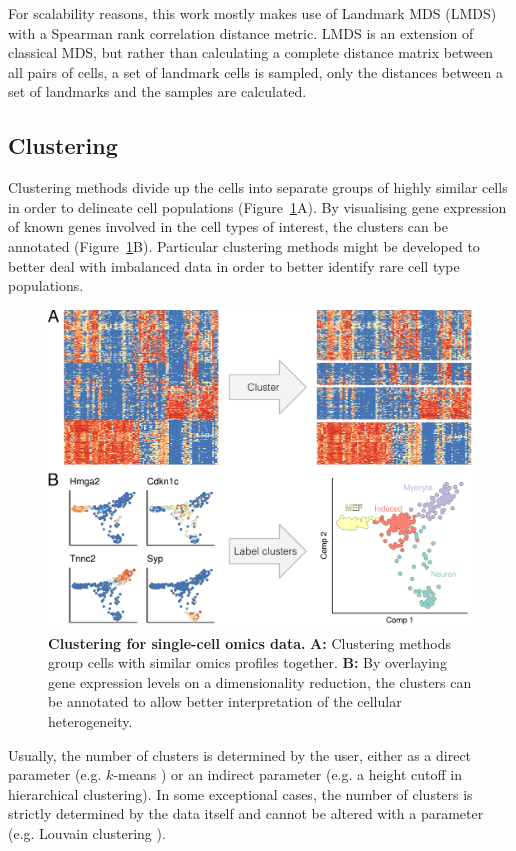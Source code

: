For scalability reasons, this work mostly makes use of Landmark MDS \cite{silva_globallocalmethods_2002,lee_landmarkmdsensemble_2009} (LMDS) with a Spearman rank correlation distance metric. LMDS is an extension of classical MDS, but rather than calculating a complete distance matrix between all pairs of cells, a set of landmark cells is sampled, only the distances between a set of landmarks and the samples are calculated. 

\subsection{Clustering}
Clustering methods divide up the cells into separate groups of highly similar cells in order to delineate cell populations (Figure~\ref{fig:comp_tools_cluster}A). By visualising gene expression of known genes involved in the cell types of interest, the clusters can be annotated (Figure~\ref{fig:comp_tools_cluster}B). Particular clustering methods might be developed to better deal with imbalanced data in order to better identify rare cell type populations.

\begin{figure}[htb!]
	\centering
	\includegraphics[width=.6\linewidth]{fig/comptools2/comptool_2_clustering.pdf} 
	\caption{
		\textbf{Clustering for single-cell omics data.}
		\textbf{A:} Clustering methods group cells with similar omics profiles together. 
		\textbf{B:} By overlaying gene expression levels on a dimensionality reduction, the clusters can be annotated to allow better interpretation of the cellular heterogeneity.
	}
	\label{fig:comp_tools_cluster}
\end{figure}


Usually, the number of clusters is determined by the user, either as a direct parameter (e.g. $k$-means \cite{lloyd_leastsquaresquantization_1982}) or an indirect parameter (e.g. a height cutoff in hierarchical clustering). In some exceptional cases, the number of clusters is strictly determined by the data itself and cannot be altered with a parameter (e.g. Louvain clustering \cite{blondel_fastunfoldingcommunities_2008}).

